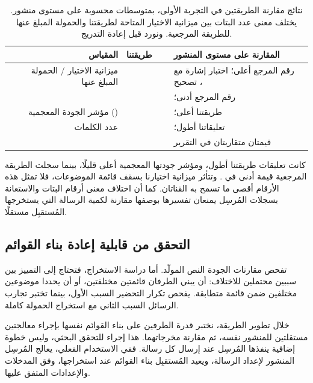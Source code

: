 \begin{table}[H]
\centering
\caption{نتائج مقارنة الطريقتين في التجربة الأولى، بمتوسطات محسوبة على مستوى  منشور. يختلف معنى عدد البتات بين ميزانية الاختيار المتاحة لطريقتنا والحمولة المبلغ عنها للطريقة المرجعية. ونورد  قبل إعادة التدريج.}
\label{tab:paired-results}
\small
\begin{RTL}
\begin{tabularx}{\columnwidth}{|D|C|C|B|}
\hline
المقياس & طريقتنا & ~\cite{lin2024zero} & المقارنة على مستوى المنشور \\
\hline
ميزانية الاختيار / الحمولة المبلغ عنها &  &  & رقم المرجع أعلى؛ اختبار إشارة مع تصحيح ،  \\
\hline
{} &  &  & رقم المرجع أدنى؛  \\
\hline
مؤشر الجودة المعجمية () &  &  & طريقتنا أعلى؛  \\
\hline
عدد الكلمات &  &  & تعليقاتنا أطول؛  \\
\hline
{} &  &  & قيمتان متقاربتان في التقرير \\
\hline
\end{tabularx}
\end{RTL}
\end{table}

كانت تعليقات طريقتنا أطول، ومؤشر جودتها المعجمية أعلى قليلًا، بينما سجلت الطريقة المرجعية قيمة أدنى في .
وتتأثر ميزانية اختيارنا بسقف قائمة الموضوعات، فلا تمثل هذه الأرقام أقصى ما تسمح به القناتان.
كما أن اختلاف معنى أرقام البتات والاستعانة بسجلات المُرسِل يمنعان تفسيرها بوصفها مقارنة لكمية الرسالة التي يستخرجها المُستقبِل مستقلًا.

\subsection{التحقق من قابلية إعادة بناء القوائم}
\label{sec:reconstruction-validation}

تفحص مقارنات الجودة النص المولّد. أما دراسة الاستخراج، فتحتاج إلى التمييز بين سببين محتملين للاختلاف: أن يبني الطرفان قائمتين مختلفتين، أو أن يحددا موضوعين مختلفين ضمن قائمة متطابقة. يفحص تكرار التحضير السبب الأول، بينما تختبر تجارب الرسائل السبب الثاني مع استخراج الحمولة كاملة.

خلال تطوير الطريقة، نختبر قدرة الطرفين على بناء القوائم نفسها بإجراء معالجتين مستقلتين للمنشور نفسه، ثم مقارنة مخرجاتهما. هذا إجراء للتحقق البحثي، وليس خطوة إضافية ينفذها المُرسِل عند إرسال كل رسالة. ففي الاستخدام الفعلي، يعالج المُرسِل المنشور لإعداد الرسالة، ويعيد المُستقبِل بناء القوائم عند استخراجها، وفق المدخلات والإعدادات المتفق عليها.

